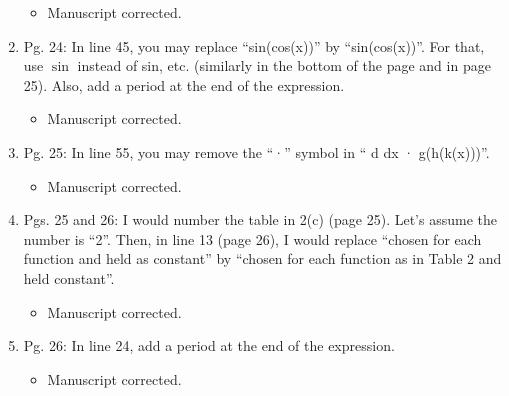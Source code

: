 \documentclass{article}
\begin{document}
\begin{enumerate}
{\color{red}  
\begin{itemize}
     \item
 Manuscript corrected.
  \end{itemize}}

 \item Pg. 24: In line 45, you may replace “sin(cos(x))” by “sin(cos(x))”. For that, use $\sin$
instead of sin, etc. (similarly in the bottom of the page and in page 25). Also, add
a period at the end of the expression.

{\color{red}  
\begin{itemize}
     \item
 Manuscript corrected.
  \end{itemize}}

 \item Pg. 25: In line 55, you may remove the “·” symbol in “ d
dx · g(h(k(x)))”.

{\color{red}  
\begin{itemize}
     \item
 Manuscript corrected.
  \end{itemize}}

 \item Pgs. 25 and 26: I would number the table in 2(c) (page 25). Let’s assume the
number is “2”. Then, in line 13 (page 26), I would replace “chosen for each function
and held as constant” by “chosen for each function as in Table 2 and held constant”.
 
{\color{red}  
\begin{itemize}
     \item
 Manuscript corrected. 
  \end{itemize}}

\item Pg. 26: In line 24, add a period at the end of the expression.

{\color{red}  
\begin{itemize}
     \item
 Manuscript corrected. 
  \end{itemize}}

  \end{enumerate}



\end{document}
